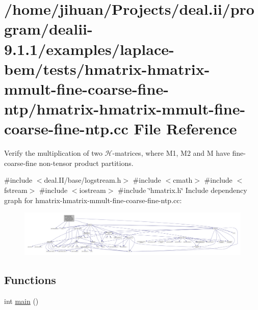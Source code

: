 \hypertarget{hmatrix-hmatrix-mmult-fine-coarse-fine-ntp_8cc}{}\section{/home/jihuan/\+Projects/deal.ii/program/dealii-\/9.1.1/examples/laplace-\/bem/tests/hmatrix-\/hmatrix-\/mmult-\/fine-\/coarse-\/fine-\/ntp/hmatrix-\/hmatrix-\/mmult-\/fine-\/coarse-\/fine-\/ntp.cc File Reference}
\label{hmatrix-hmatrix-mmult-fine-coarse-fine-ntp_8cc}


Verify the multiplication of two $\mathcal{H}$-\/matrices, where M1, M2 and M have fine-\/coarse-\/fine non-\/tensor product partitions.  


{\ttfamily \#include $<$deal.\+I\+I/base/logstream.\+h$>$}\newline
{\ttfamily \#include $<$cmath$>$}\newline
{\ttfamily \#include $<$fstream$>$}\newline
{\ttfamily \#include $<$iostream$>$}\newline
{\ttfamily \#include \char`\"{}hmatrix.\+h\char`\"{}}\newline
Include dependency graph for hmatrix-\/hmatrix-\/mmult-\/fine-\/coarse-\/fine-\/ntp.cc\+:\nopagebreak
\begin{figure}[H]
\begin{center}
\leavevmode
\includegraphics[width=350pt]{hmatrix-hmatrix-mmult-fine-coarse-fine-ntp_8cc__incl}
\end{center}
\end{figure}
\subsection*{Functions}
\begin{DoxyCompactItemize}
\item 
int \hyperlink{hmatrix-hmatrix-mmult-fine-coarse-fine-ntp_8cc_ae66f6b31b5ad750f1fe042a706a4e3d4}{main} ()
\end{DoxyCompactItemize}


